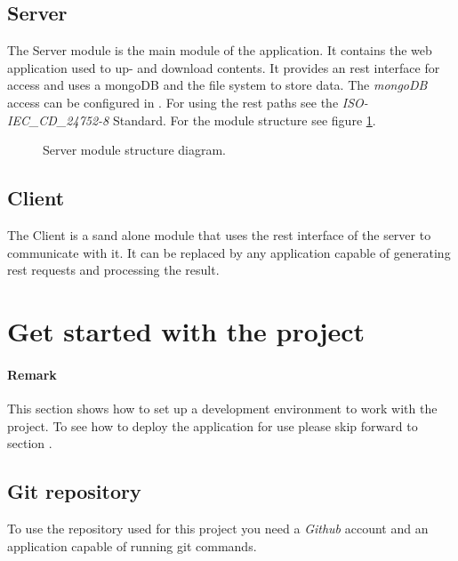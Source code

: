 \documentclass[10pt]{article}
\begin{document}
\subsection{Server}
The Server module is the main module of the application. It contains the web application used to up- and download contents. It provides an rest interface for access and uses a mongoDB and the file system to store data. The \emph{mongoDB} access can be configured in . For using the rest paths see the \emph{ISO-IEC\_CD\_24752-8} Standard. For the module structure see figure \ref{fig:serveruml}.
\begin{figure}[b]
\centering
{}
\caption{Server module structure diagram.}
\label{fig:serveruml}
\end{figure}
\subsection{Client}
The Client is a sand alone module that uses the rest interface of the server to communicate with it. It can be replaced by any application capable of generating rest requests and processing the result.
\section{Get started with the project}
\paragraph{Remark} This section shows how to set up a development environment to work with the project. To see how to deploy the application for use please skip forward to section .
\subsection{Git repository}
To use the repository used for this project you need a \emph{Github} account and an application capable of running git commands.
\end{document}
